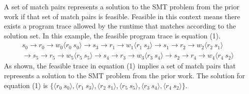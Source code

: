 A set of match pairs represents a solution to the SMT problem from the prior work if that set of match pairs is feasible. Feasible in this context means there exists a program trace allowed by the runtime that matches according to the solution set. In this example, the feasible program trace is equation (1). 
\begin{equation}
\begin{split}
s_0\rightarrow r_0\rightarrow w_0\langle r_0\ s_0\rangle \rightarrow s_3\rightarrow r_1\rightarrow w_1\langle r_1\ s_3\rangle \rightarrow s_1\rightarrow r_2\rightarrow w_2\langle r_2\ s_1\rangle \\
\rightarrow s_5\rightarrow r_5\rightarrow w_5\langle r_5\ s_5\rangle \rightarrow s_4\rightarrow r_3\rightarrow w_3\langle r_3\ s_4\rangle \rightarrow s_2\rightarrow r_4\rightarrow w_4\langle r_4\ s_2\rangle
\end{split}
\end{equation} 
As shown, the feasible trace in equation (1) implies a set of match pairs that represents a solution to the SMT problem from the prior work. The solution for equation (1) is $\{\langle r_0\ s_0\rangle, \langle r_1\ s_3\rangle, \langle r_2\ s_1\rangle, \langle r_5\ s_5\rangle, \langle r_3\ s_4\rangle, \langle r_4\ s_2\rangle\}$.



